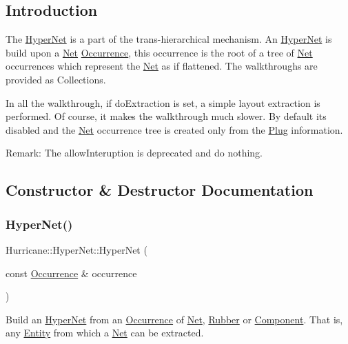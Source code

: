 \hypertarget{classHurricane_1_1HyperNet_secHyperNetIntro}{}\subsection{Introduction}\label{classHurricane_1_1HyperNet_secHyperNetIntro}
The \hyperlink{classHurricane_1_1HyperNet}{Hyper\+Net} is a part of the trans-\/hierarchical mechanism. An \hyperlink{classHurricane_1_1HyperNet}{Hyper\+Net} is build upon a \hyperlink{classHurricane_1_1Net}{Net} \hyperlink{classHurricane_1_1Occurrence}{Occurrence}, this occurrence is the root of a tree of \hyperlink{classHurricane_1_1Net}{Net} occurrences which represent the \hyperlink{classHurricane_1_1Net}{Net} as if flattened. The walkthroughs are provided as Collections.

In all the walkthrough, if {\ttfamily do\+Extraction} is set, a simple layout extraction is performed. Of course, it makes the walkthrough much slower. By default it\textquotesingle{}s disabled and the \hyperlink{classHurricane_1_1Net}{Net} occurrence tree is created only from the \hyperlink{classHurricane_1_1Plug}{Plug} information.

\begin{DoxyParagraph}{Remark\+:}
The {\ttfamily allow\+Interuption} is deprecated and do nothing. 
\end{DoxyParagraph}


\subsection{Constructor \& Destructor Documentation}
\mbox{\label{classHurricane_1_1HyperNet_a30bdc04b4dece8bdef66361fe4469175}} 
\subsubsection{\texorpdfstring{Hyper\+Net()}{HyperNet()}}
{\footnotesize\ttfamily Hurricane\+::\+Hyper\+Net\+::\+Hyper\+Net (\begin{DoxyParamCaption}\item[{const \hyperlink{classHurricane_1_1Occurrence}{Occurrence} \&}]{occurrence }\end{DoxyParamCaption})}

Build an \hyperlink{classHurricane_1_1HyperNet}{Hyper\+Net} from an \hyperlink{classHurricane_1_1Occurrence}{Occurrence} of \hyperlink{classHurricane_1_1Net}{Net}, \hyperlink{classHurricane_1_1Rubber}{Rubber} or \hyperlink{classHurricane_1_1Component}{Component}. That is, any \hyperlink{classHurricane_1_1Entity}{Entity} from which a \hyperlink{classHurricane_1_1Net}{Net} can be extracted. 

